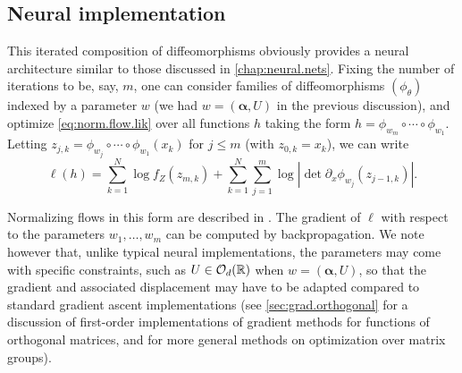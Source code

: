 \subsection{Neural implementation}
This iterated composition of diffeomorphisms obviously provides a neural architecture  similar to those discussed in \cref{chap:neural.nets}. Fixing the number of iterations to be, say, $m$, one can consider families of diffeomorphisms $(\phi_\theta)$ indexed by a parameter $w$ (we had $w = (\boldsymbol\alpha, U)$ in the previous discussion), and optimize 
\cref{eq:norm.flow.lik} over all functions $h$ taking the form $h = \phi_{w_m} \circ \cdots \circ \phi_{w_1}$. Letting $z_{j,k} =  \phi_{w_j} \circ \cdots \circ \phi_{w_1}(x_k)$ for $j\leq m$ (with $z_{0,k} = x_k$), we can write
\[
\ell(h) = \sum_{k=1}^N \log f_Z(z_{m,k}) + \sum_{k=1}^N \sum_{j=1}^m \log |\det{\partial_x \phi_{w_j}(z_{j-1,k})}|.
\]

Normalizing flows in this form are described in \citep{rezende2015variational,kobyzev2020normalizing,
papamakarios2021normalizing}. The gradient of $\ell$ with respect to the parameters $w_1, \ldots, w_m$ can be computed by backpropagation. We note however that, unlike typical neural implementations, the parameters may come with specific constraints, such as $U\in {\mathcal O}_d({\mathbb{R}})$ when $w = (\boldsymbol\alpha, U)$, so that the gradient and associated displacement may have to be adapted compared to standard gradient ascent implementations (see \cref{sec:grad.orthogonal} for a discussion of first-order implementations of gradient methods for functions of orthogonal matrices, and \citep{absil2008optimization} for more general methods on optimization over matrix groups).

